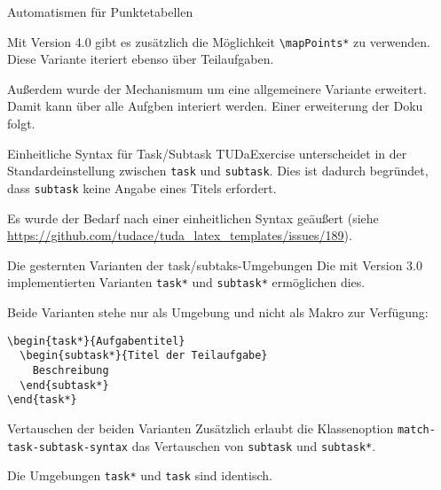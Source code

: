 \documentclass[
	german,%
	accentcolor=9c,%
	points=true, für die Aktivierung der Punktereferenzen
]{tudaexercise}
\newcommand*{\code}[1]{\texttt{#1}}
\begin{document}
\begin{task}[points=auto]{Automatismen für Punktetabellen}
\begin{subtask}[points=3,title={Automatische Punktetabellen}]
	\end{subtask}

	\begin{subtask}[points=5,title={Detaillierte Punktetabellen inklusive Teilaufgaben}]
		Mit Version 4.0 gibt es zusätzlich die Möglichkeit \verb+\mapPoints*+ zu verwenden.
		Diese Variante iteriert ebenso über Teilaufgaben.

		Außerdem wurde der Mechanismum um eine allgemeinere Variante erweitert.
		Damit kann über alle Aufgben interiert werden.
		Einer erweiterung der Doku folgt.
	\end{subtask}
\end{task}

\begin{task*}{Einheitliche Syntax für Task/Subtask}
	\label{task-subtask-syntax}
	TUDaExercise unterscheidet in der Standardeinstellung zwischen \code{task} und \code{subtask}. Dies ist dadurch begründet, dass \code{subtask} keine Angabe eines Titels erfordert.

	Es wurde der Bedarf nach einer einheitlichen Syntax geäußert (siehe \url{https://github.com/tudace/tuda_latex_templates/issues/189}).

	\begin{subtask*}{Die gesternten Varianten der task/subtaks-Umgebungen}
		Die mit Version 3.0 implementierten Varianten \code{task*} und \code{subtask*} ermöglichen dies.

		Beide Varianten stehe nur als Umgebung und nicht als Makro zur Verfügung:

\begin{verbatim}
\begin{task*}{Aufgabentitel}
  \begin{subtask*}{Titel der Teilaufgabe}
    Beschreibung
  \end{subtask*}
\end{task*}
\end{verbatim}
	\end{subtask*}

	\begin{subtask*}{Vertauschen der beiden Varianten}
		Zusätzlich erlaubt die Klassenoption \code{match-task-subtask-syntax} das Vertauschen von \code{subtask} und \code{subtask*}.

		Die Umgebungen \code{task*} und \code{task} sind identisch.
	\end{subtask*}
\end{task*}
\end{document}
